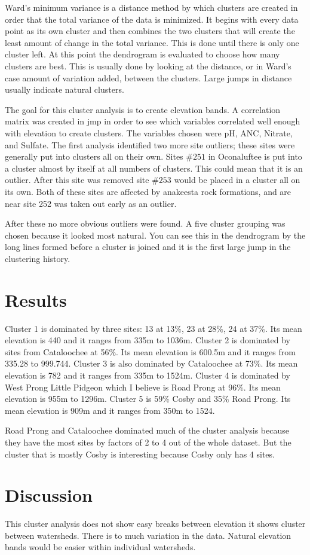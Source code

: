 \documentclass[11pt]{article} %
\begin{document}
Ward’s minimum variance is a distance method by which clusters are created in order that the total variance of the data is minimized.  It begins with every data point as its own cluster and then combines the two clusters that will create the least amount of change in the total variance.  This is done until there is only one cluster left.  At this point the dendrogram is evaluated to choose how many clusters are best.  This is usually done by looking at the distance, or in Ward’s case amount of variation added, between the clusters.  Large jumps in distance usually indicate natural clusters.

The goal for this cluster analysis is to create elevation bands.  A correlation matrix was created in jmp in order to see which variables correlated well enough with elevation to create clusters.  The variables chosen were pH, ANC, Nitrate, and Sulfate.   The first analysis identified two more site outliers; these sites were generally put into clusters all on their own.  Sites $\#251$ in Oconaluftee is put into a cluster almost by itself at all numbers of clusters.  This could mean that it is an outlier.  After this site was removed site $\#253$ would be placed in a cluster all on its own.  Both of these sites are affected by anakeesta rock formations, and are near site 252 was taken out early as an outlier.

After these no more obvious outliers were found.  A five cluster grouping was chosen because it looked most natural.  You can see this in the dendrogram by the long lines formed before a cluster is joined and it is the first large jump in the clustering history.

\section{Results}
Cluster 1 is dominated by three sites: 13 at 13$\%$, 23 at 28$\%$, 24 at 37$\%$.  Its mean elevation is 440 and it ranges from 335m to 1036m.  Cluster 2 is dominated by sites from Cataloochee at 56$\%$.  Its mean elevation is 600.5m and it ranges from 335.28 to 999.744.  Cluster 3 is also dominated by Cataloochee at 73$\%$. Its mean elevation is 782 and it ranges from 335m to 1524m.  Cluster 4 is dominated by West Prong Little Pidgeon which I believe is Road Prong at 96$\%$.  Its mean elevation is 955m to 1296m.  Cluster 5 is 59$\%$ Cosby and 35$\%$ Road Prong.  Its mean elevation is 909m and it ranges from 350m to 1524.

Road Prong and Cataloochee dominated much of the cluster analysis because they have the most sites by factors of 2 to 4 out of the whole dataset.  But the cluster that is mostly Cosby is interesting because Cosby only has 4 sites. 

\section{Discussion}
This cluster analysis does not show easy breaks between elevation it shows cluster between watersheds.  There is to much variation in the data. Natural elevation bands would be easier within individual watersheds.
\end{document}
